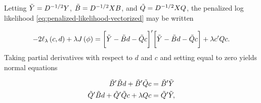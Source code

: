 %
%
%
%
%


Letting $\tilde{Y} = D^{-1/2} Y$, $\tilde{B} = D^{-1/2} X B $, and $\tilde{Q} = D^{-1/2} X Q$, the penalized log likelihood \ref{eq:penalized-likelihood-vectorized} may be written

\begin{equation}\label{eq:penalized-loglik-tilde-vectorized}
-2\ell_\lambda \left(c, d \right) + \lambda J\left( \phi \right) = \bigg[ \tilde{Y} - \tilde{B} d - \tilde{Q} c\bigg]'\bigg[ \tilde{Y} - \tilde{B} d - \tilde{Q} c\bigg] + \lambda c'Qc.
\end{equation}
\noindent
Taking partial derivatives with respect to $d$ and $c$ and setting equal to zero yields normal equations 

\begin{align}
\begin{split}
\tilde{B}'\tilde{B} d + \tilde{B}'\tilde{Q} c &= \tilde{B}' \tilde{Y} \\
\tilde{Q}'\tilde{B} d + \tilde{Q}'\tilde{Q} c + \lambda Q c &= \tilde{Q}' \tilde{Y}, 
\end{split}
\end{align}


